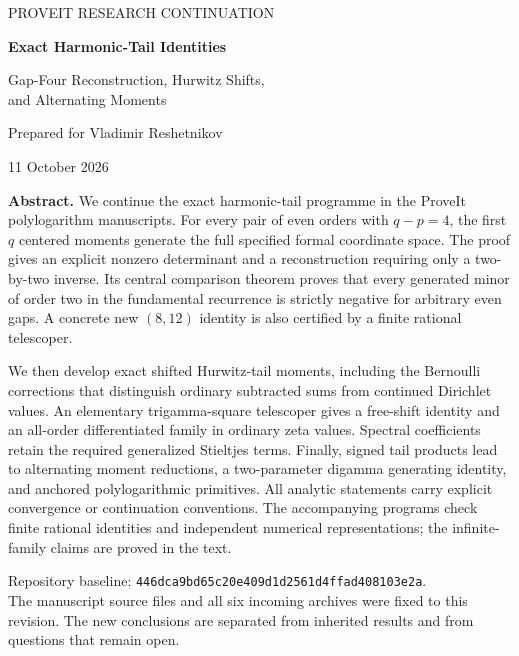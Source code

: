 \documentclass[11pt]{article}
\theoremstyle{definition}
\theoremstyle{remark}
\numberwithin{equation}{section}
\begin{document}
\hypersetup{pageanchor=false}
\begin{titlepage}
\centering
\vspace*{0.9in}
{\Large\color{navy}\sffamily PROVEIT RESEARCH CONTINUATION\par}
\vspace{0.45in}
{\LARGE\bfseries Exact Harmonic-Tail Identities\par}
\vspace{0.2in}
{\Large Gap-Four Reconstruction, Hurwitz Shifts,\\[5pt]
and Alternating Moments\par}
\vspace{0.5in}
{\large Prepared for Vladimir Reshetnikov\par}
\vspace{0.15in}
{11 October 2026\par}
\vspace{0.55in}
\begin{minipage}{0.89\textwidth}
\small
\textbf{Abstract.}
We continue the exact harmonic-tail programme in the ProveIt
polylogarithm manuscripts. For every pair of even orders with
$q-p=4$, the first $q$ centered moments generate the full specified
formal coordinate space. The proof gives an explicit nonzero
determinant and a reconstruction requiring only a two-by-two inverse.
Its central comparison theorem proves that every generated minor of
order two in the fundamental recurrence is strictly negative for
arbitrary even gaps. A concrete new $(8,12)$ identity is also certified
by a finite rational telescoper.

We then develop exact shifted Hurwitz-tail moments, including the
Bernoulli corrections that distinguish ordinary subtracted sums from
continued Dirichlet values. An elementary trigamma-square telescoper
gives a free-shift identity and an all-order differentiated family in
ordinary zeta values. Spectral coefficients retain the required
generalized Stieltjes terms. Finally, signed tail products lead to
alternating moment reductions, a two-parameter digamma generating
identity, and anchored polylogarithmic primitives. All analytic
statements carry explicit convergence or continuation conventions.
The accompanying programs check finite rational identities and
independent numerical representations; the infinite-family claims
are proved in the text.
\end{minipage}
\vfill
\begin{minipage}{0.89\textwidth}
\footnotesize\color{muted}
Repository baseline:
\texttt{446dca9bd65c20e409d1d2561d4ffad408103e2a}.\\
The manuscript source files and all six incoming archives were fixed
to this revision. The new conclusions are separated from inherited
results and from questions that remain open.
\end{minipage}
\end{titlepage}
\clearpage
{}
\hypersetup{pageanchor=true}
\tableofcontents
\clearpage
{}








\end{document}
